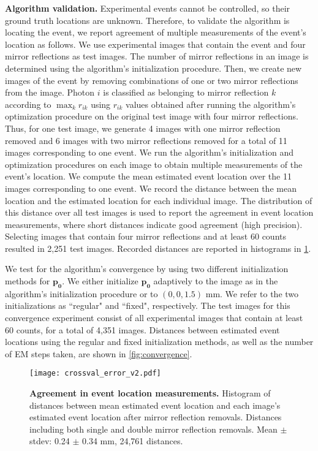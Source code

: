 \noindent
\textbf{Algorithm validation.}
Experimental events cannot be controlled, so their ground truth locations are unknown.
Therefore, to validate the algorithm is locating the event, we report agreement of 
multiple measurements of the event's location as follows.
We use experimental images that contain the event and four mirror reflections as 
test images.
The number of mirror reflections in an image is determined using the algorithm's 
initialization procedure.
Then, we create new images of the event by removing combinations of one or two 
mirror reflections from the image.
Photon $i$ is classified as belonging to mirror reflection $k$ according to 
$\max_k r_{ik}$ using $r_{ik}$ values obtained after running the algorithm's 
optimization procedure on the original test image with four mirror reflections.
Thus, for one test image, we generate 4 images with one mirror reflection removed 
and 6 images with two mirror reflections removed for a total of 11 images 
corresponding to one event.
We run the algorithm's initialization and optimization procedures on each image to 
obtain multiple measurements of the event's location.
We compute the mean estimated event location over the 11 images corresponding to 
one event.
We record the distance between the mean location and the estimated location for 
each individual image.
The distribution of this distance over all test images is used to report the 
agreement in event location measurements, where short distances indicate good 
agreement (high precision).
Selecting images that contain four mirror reflections and at least 60 counts 
resulted in 2,251 test images.
Recorded distances are reported in histograms in \cref{fig:crossval_error}.

We test for the algorithm's convergence by using two different initialization 
methods for $\bm{p_0}$. 
We either initialize $\bm{p_0}$ adaptively to the image as in the algorithm's 
initialization procedure or to $(0,0,1.5)$ mm.
We refer to the two initializations as ``regular" and ``fixed", respectively.
The test images for this convergence experiment consist of all experimental images 
that contain at least 60 counts, for a total of 4,351 images.
Distances between estimated event locations using the regular and fixed 
initialization methods, as well as the number of EM steps taken, are shown in \cref{fig:convergence}.

\begin{figure}
\centering
\texttt{[image: crossval\_error\_v2.pdf]}
\caption{\textbf{Agreement in event location measurements.} Histogram of distances between mean estimated event location and each image's estimated event location after mirror reflection removals. Distances including both single and double mirror reflection removals. Mean $\pm$ stdev: 0.24 $\pm$ 0.34 mm, 24,761 distances.
} 
\label{fig:crossval_error}
\end{figure}

